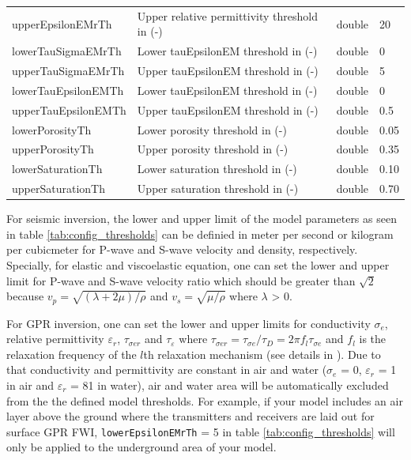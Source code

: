 \documentclass[pdftex,a4paper,parskip,listof=totoc,bibliography=totoc,onehalfspacing,12pt]{scrreprt}
\begin{document}
\begin{table}[h!]
\begin{adjustbox}{width=1\textwidth,center=\textwidth}
\begin{tabular}{llll}
         upperEpsilonEMrTh           & Upper relative permittivity threshold in (-)                 & double & 20 \\
         lowerTauSigmaEMrTh           & Lower tauEpsilonEM threshold in (-)                 & double & 0 \\
         upperTauSigmaEMrTh           & Upper tauEpsilonEM threshold in (-)                & double & 5 \\
         lowerTauEpsilonEMTh           & Lower tauEpsilonEM threshold in (-)                 & double & 0 \\
         upperTauEpsilonEMTh           & Upper tauEpsilonEM threshold in (-)                 & double & 0.5 \\
         lowerPorosityTh           & Lower porosity threshold in (-)                 & double & 0.05 \\
         upperPorosityTh           & Upper porosity threshold in (-)                 & double & 0.35 \\
         lowerSaturationTh           & Lower saturation threshold in (-)                 & double & 0.10 \\
         upperSaturationTh           & Upper saturation threshold in (-)                 & double & 0.70 \\
	\bottomrule
	\end{tabular}
	\end{adjustbox}
\end{table}
For seismic inversion, the lower and upper limit of the model parameters as seen in table \ref{tab:config_thresholds} can be definied in meter per second or kilogram per cubicmeter for P-wave and S-wave velocity and density, respectively. Specially, for elastic and viscoelastic equation, one can set the lower and upper limit for P-wave and S-wave velocity ratio which should be greater than $\sqrt{2}$ because $v_p=\sqrt{(\lambda+2\mu)/\rho}$ and $v_s=\sqrt{\mu/\rho}$ where $\lambda$ > 0.

For GPR inversion, one can set the lower and upper limits for conductivity $\sigma_e$, relative permittivity $\varepsilon_r$, $\tau_{\sigma e r}$ and $\tau_{\varepsilon}$ where $\tau_{\sigma e r}=\tau_{\sigma e}/\tau_{D}=2 \pi f_l \tau_{\sigma e}$ and $f_l$ is the relaxation frequency of the $l$th relaxation mechanism (see details in \cite{qin2020full}). Due to that conductivity and permittivity are constant in air and water ($\sigma_e$ = 0, $\varepsilon_r$ = 1 in air and $\varepsilon_r$ = 81 in water), air and water area will be automatically excluded from the the defined model thresholds. For example, if your model includes an air layer above the ground where the transmitters and receivers are laid out for surface GPR FWI, \verb+lowerEpsilonEMrTh+ = 5 in table \ref{tab:config_thresholds} will only be applied to the underground area of your model.
\end{document}
